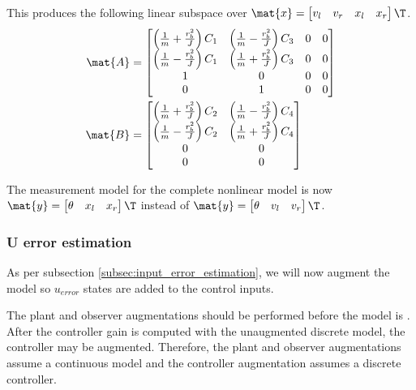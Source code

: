 This produces the following linear subspace over
$\mat{x} = \begin{bmatrix}v_l & v_r & x_l & x_r\end{bmatrix}\T$.
\begin{align}
  \mat{A} &=
  \begin{bmatrix}
    \left(\frac{1}{m} + \frac{r_b^2}{J}\right) C_1 &
      \left(\frac{1}{m} - \frac{r_b^2}{J}\right) C_3 & 0 & 0 \\
    \left(\frac{1}{m} - \frac{r_b^2}{J}\right) C_1 &
      \left(\frac{1}{m} + \frac{r_b^2}{J}\right) C_3 & 0 & 0 \\
    1 & 0 & 0 & 0 \\
    0 & 1 & 0 & 0
  \end{bmatrix} \\
  \mat{B} &=
  \begin{bmatrix}
    \left(\frac{1}{m} + \frac{r_b^2}{J}\right) C_2 &
      \left(\frac{1}{m} - \frac{r_b^2}{J}\right) C_4 \\
    \left(\frac{1}{m} - \frac{r_b^2}{J}\right) C_2 &
      \left(\frac{1}{m} + \frac{r_b^2}{J}\right) C_4 \\
    0 & 0 \\
    0 & 0
  \end{bmatrix}
  \label{eq:diff_drive_linear_subspace}
\end{align}

The measurement model for the complete nonlinear model is now
$\mat{y} = \begin{bmatrix}\theta & x_l & x_r\end{bmatrix}\T$ instead of
$\mat{y} = \begin{bmatrix}\theta & v_l & v_r\end{bmatrix}\T$.

\subsubsection{U error estimation}

As per subsection \ref{subsec:input_error_estimation}, we will now augment the
\gls{model} so $u_{error}$ states are added to the \glspl{control input}.

The \gls{plant} and \gls{observer} augmentations should be performed before the
\gls{model} is . After the \gls{controller}
gain is computed with the unaugmented discrete \gls{model}, the controller may
be augmented. Therefore, the \gls{plant} and \gls{observer} augmentations assume
a continuous \gls{model} and the \gls{controller} augmentation assumes a
discrete \gls{controller}.

